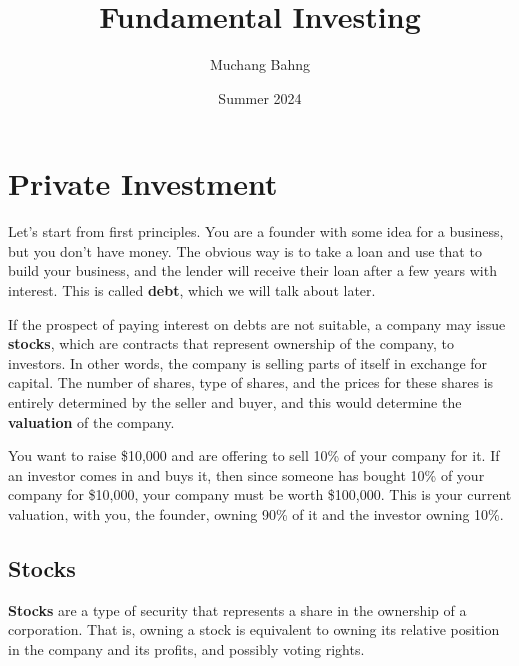 \documentclass{article}
\begin{document}
\title{Fundamental Investing}
\author{Muchang Bahng}
\date{Summer 2024}

\maketitle
\tableofcontents
\pagebreak

\section{Private Investment}

    Let's start from first principles. You are a founder with some idea for a business, but you don't have money. The obvious way is to take a loan and use that to build your business, and the lender will receive their loan after a few years with interest. This is called \textbf{debt}, which we will talk about later.  

    If the prospect of paying interest on debts are not suitable, a company may issue \textbf{stocks}, which are contracts that represent ownership of the company, to investors. In other words, the company is selling parts of itself in exchange for capital. The number of shares, type of shares, and the prices for these shares is entirely determined by the seller and buyer, and this would determine the \textbf{valuation} of the company. 

    \begin{example}
      \label{ex:primitive-stages-of-investment}
      You want to raise \$10,000 and are offering to sell 10\% of your company for it. If an investor comes in and buys it, then since someone has bought 10\% of your company for \$10,000, your company must be worth \$100,000. This is your current valuation, with you, the founder, owning 90\% of it and the investor owning 10\%. 
    \end{example}

  \subsection{Stocks}

    \begin{definition}[Stocks]
      \label{def:stocks}
      \textbf{Stocks} are a type of security that represents a share in the ownership of a corporation. That is, owning a stock is equivalent to owning its relative position in the company and its profits, and possibly voting rights. 
    \end{definition}
\end{document}
